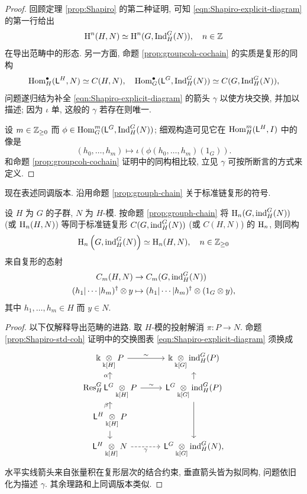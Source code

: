 \begin{proof}
	回顾定理 \ref{prop:Shapiro} 的第二种证明, 可知 \eqref{eqn:Shapiro-explicit-diagram} 的第一行给出
	\[ \operatorname{H}^n(H, N) \simeq \operatorname{H}^n(G, \operatorname{Ind}^G_H(N)), \quad n \in \mathbb{Z} \]
	在导出范畴中的形态. 另一方面, 命题 \ref{prop:groupcoh-cochain} 的实质是复形的同构
	\[ \operatorname{Hom}^\bullet_H(\mathsf{L}^H, N) \simeq C(H, N), \quad \operatorname{Hom}^\bullet_G(\mathsf{L}^G, \operatorname{Ind}^G_H(N)) \simeq C(G, \operatorname{Ind}^G_H(N)), \]
	问题遂归结为补全 \eqref{eqn:Shapiro-explicit-diagram} 的箭头 $\gamma$ 以使方块交换, 并加以描述; 因为 $\iota$ 单, 这般的 $\gamma$ 若存在则唯一.
	
	设 $m \in \mathbb{Z}_{\geq 0}$ 而 $\phi \in \operatorname{Hom}^m_G(\mathsf{L}^G, \operatorname{Ind}^G_H(N))$; 细观构造可见它在 $\operatorname{Hom}^m_H(\mathsf{L}^H, I)$ 中的像是
	\[ (h_0, \ldots, h_m) \mapsto \iota\left(\phi(h_0, \ldots, h_m)(1_G)\right). \]
	和命题 \ref{prop:groupcoh-cochain} 证明中的同构相比较, 立见 $\gamma$ 可按所断言的方式来定义.
\end{proof}

现在表述同调版本. 沿用命题 \ref{prop:grouph-chain} 关于标准链复形的符号.

\begin{proposition}\label{prop:Shapiro-std-ho}
	设 $H$ 为 $G$ 的子群, $N$ 为 $H$-模. 按命题 \ref{prop:grouph-chain} 将 $\operatorname{H}_n(G, \operatorname{ind}^G_H(N))$ (或 $\operatorname{H}_n(H, N)$) 等同于标准链复形 $C(G, \operatorname{ind}^G_H(N))$ (或 $C(H, N)$) 的 $\operatorname{H}_n$, 则同构
	\[ \operatorname{H}_n\left(G, \operatorname{ind}^G_H(N)\right) \simeq \operatorname{H}_n(H, N), \quad n \in \mathbb{Z}_{\geq 0} \]
	来自复形的态射
	\begin{align*}
		C_m(H, N) & \to C_m(G, \operatorname{ind}^G_H(N)) \\
		(h_1 | \cdots | h_m)^\dagger \otimes y & \mapsto (h_1 | \cdots |h_m)^\dagger \otimes (1_G \otimes y),
	\end{align*}
	其中 $h_1, \ldots, h_m \in H$ 而 $y \in N$.
\end{proposition}
\begin{proof}
	以下仅解释导出范畴的进路. 取 $H$-模的投射解消 $\pi: P \to N$. 命题 \ref{prop:Shapiro-std-coh} 证明中的交换图表 \eqref{eqn:Shapiro-explicit-diagram} 须换成
	\begin{equation*}\begin{tikzcd}[row sep=small]
		\Bbbk \dotimes{\Bbbk[H]} P \arrow[r, "\sim"] & \Bbbk \dotimes{\Bbbk[G]} \iInd^G_H(P) \\
		\Res^G_H \mathsf{L}^G \dotimes{\Bbbk[H]} P \arrow[r, "\sim"] \arrow[u, "\alpha"] & \mathsf{L}^G \dotimes{\Bbbk[G]} \iInd^G_H(P) \arrow[u] \arrow[dd] \\
		\mathsf{L}^H \dotimes{\Bbbk[H]} P \arrow[u, "\beta"] \arrow[d] & \\
		\mathsf{L}^H \dotimes{\Bbbk[H]} N \arrow[dashed, r, "\gamma"'] & \mathsf{L}^G \dotimes{\Bbbk[G]} \iInd^G_H(N),
	\end{tikzcd}\end{equation*}
	水平实线箭头来自张量积在复形层次的结合约束, 垂直箭头皆为拟同构, 问题依旧化为描述 $\gamma$. 其余理路和上同调版本类似.
\end{proof}


